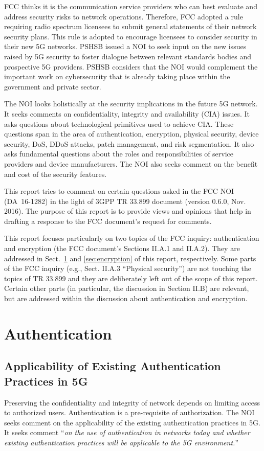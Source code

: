 \documentclass[12pt]{llncs}
\newcommand\ques[1]{``\emph{#1}''}
\begin{document}
FCC thinks it is the communication service providers who can best evaluate and address security risks to network operations. Therefore, FCC adopted a rule requiring radio spectrum licensees to submit general statements of their network security plans. This rule is adopted to encourage licensees to consider security in their new 5G networks. PSHSB issued a NOI to seek input on the new issues raised by 5G security to foster dialogue between relevant standards bodies and prospective 5G providers. PSHSB considers that the NOI would complement the important work on cybersecurity that is already taking place within the government and private sector.

The NOI looks holistically at the security implications in the future 5G network. It seeks comments on confidentiality, integrity and availability (CIA) issues. It asks questions about technological primitives used to achieve CIA. These questions span in the area of authentication, encryption, physical security, device security, DoS, DDoS attacks, patch management, and risk segmentation. It also asks fundamental questions about the roles and responsibilities of service providers and device manufacturers. The NOI also seeks comment on the benefit and cost of the security features.

This report tries to comment on certain questions asked in the FCC NOI (DA~16-1282) in the light of 3GPP TR 33.899 document (version 0.6.0, Nov. 2016). The purpose of this report is to provide views and opinions that help in drafting a response to the FCC document's request for comments.

This report focuses particularly on two topics of the FCC inquiry: authentication and encryption (the FCC document's Sections II.A.1 and II.A.2). They are addressed in Sect.~\ref{sec:authentication} and \ref{sec:encryption} of this report, respectively. Some parts of the FCC inquiry (e.g., Sect. II.A.3 ``Physical security'') are not touching the topics of TR 33.899 and they are deliberately left out of the scope of this report. Certain other parts (in particular, the discussion in Section II.B) are relevant, but are addressed within the discussion about authentication and encryption.

\section{Authentication}
\label{sec:authentication}
\subsection{Applicability of Existing Authentication Practices in 5G}
Preserving the confidentiality and integrity of network depends on limiting access to authorized users. Authentication is a pre-requisite of authorization. The NOI seeks comment on the applicability of the existing authentication practices in 5G. It seeks comment \ques{on the use of authentication in networks today and whether existing authentication practices will be applicable to the 5G environment.}
\end{document}
